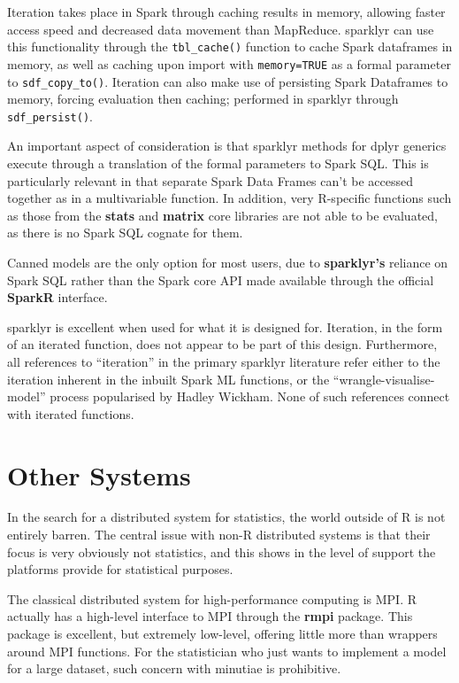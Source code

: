 \documentclass[a4paper,10pt]{article}
\begin{document}
Iteration takes place in Spark through caching results in memory, allowing faster access speed and decreased data movement than MapReduce\cite{zaharia2010spark}.
sparklyr can use this functionality through the \texttt{tbl\_cache()} function to cache Spark dataframes in memory, as well as caching upon import with \texttt{memory=TRUE} as a formal parameter to \texttt{sdf\_copy\_to()}.
Iteration can also make use of persisting Spark Dataframes to memory, forcing evaluation then caching; performed in sparklyr through \texttt{sdf\_persist()}.

An important aspect of consideration is that sparklyr methods for dplyr generics execute through a translation of the formal parameters to Spark SQL.
This is particularly relevant in that separate Spark Data Frames can't be accessed together as in a multivariable function.
In addition, very R-specific functions such as those from the \textbf{stats} and \textbf{matrix} core libraries are not able to be evaluated, as there is no Spark SQL cognate for them.

Canned models are the only option for most users, due to \textbf{sparklyr's} reliance on Spark SQL rather than the Spark core API made available through the official \textbf{SparkR} interface.

sparklyr is excellent when used for what it is designed for.
Iteration, in the form of an iterated function, does not appear to be part of this design. 
Furthermore, all references to ``iteration'' in the primary sparklyr literature refer either to the iteration inherent in the inbuilt Spark ML functions, or the ``wrangle-visualise-model'' process popularised by Hadley Wickham\cite{luraschi2019mastering}\cite{wickham2016r}.
None of such references connect with iterated functions.

\section{Other Systems}

In the search for a distributed system for statistics, the world outside of R is not entirely barren.
The central issue with non-R distributed systems is that their focus is very obviously not statistics, and this shows in the level of support the platforms provide for statistical purposes.

The classical distributed system for high-performance computing is MPI.
R actually has a high-level interface to MPI through the \textbf{rmpi} package.
This package is excellent, but extremely low-level, offering little more than wrappers around MPI functions.
For the statistician who just wants to implement a model for a large dataset, such concern with minutiae is prohibitive.\\
\end{document}
